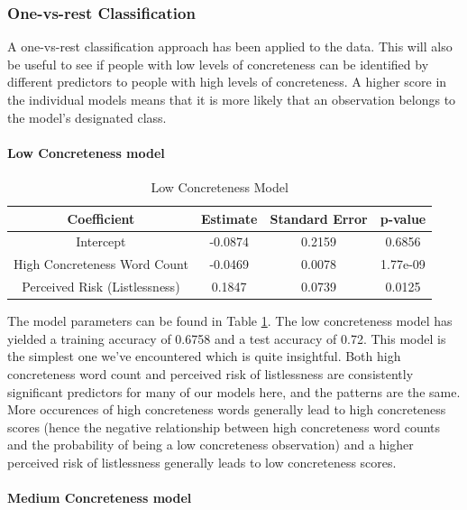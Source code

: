 \documentclass[12pt, a4paper]{article}
\begin{document}
\subsubsection{One-vs-rest Classification}

A one-vs-rest classification approach has been applied to the data. This will also be useful to see if people with low levels of concreteness can be identified by different predictors to people with high levels of concreteness. A higher score in the individual models means that it is more likely that an observation belongs to the model's designated class.

\paragraph{Low Concreteness model}

\begin{table}[ht]
\centering
\begin{tabular}{||c c c c||} 
 \hline
 Coefficient & Estimate & Standard Error & p-value \\ [0.5ex] 
 \hline\hline
 Intercept & -0.0874 & 0.2159 & 0.6856 \\ 
 High Concreteness Word Count & -0.0469 & 0.0078 & 1.77e-09 \\
 Perceived Risk (Listlessness)  & 0.1847 & 0.0739 & 0.0125 \\ [1ex] 
 \hline
\end{tabular}
\caption{Low Concreteness Model}
\label{table:low}
\end{table}

The model parameters can be found in Table \ref{table:low}. The low concreteness model has yielded a training accuracy of 0.6758 and a test accuracy of 0.72. This model is the simplest one we've encountered which is quite insightful. Both high concreteness word count and perceived risk of listlessness are consistently significant predictors for many of our models here, and the patterns are the same. More occurences of high concreteness words generally lead to high concreteness scores (hence the negative relationship between high concreteness word counts and the probability of being a low concreteness observation) and a higher perceived risk of listlessness generally leads to low concreteness scores.

\paragraph{Medium Concreteness model}
\end{document}
